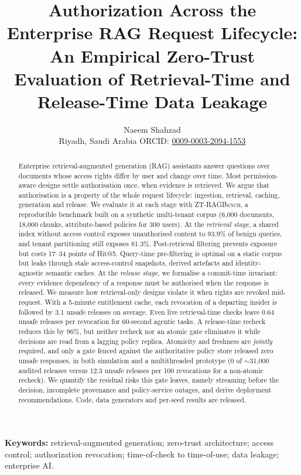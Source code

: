 \documentclass[10pt]{article}
\title{Authorization Across the Enterprise RAG Request Lifecycle:\\An Empirical Zero-Trust Evaluation of Retrieval-Time and Release-Time Data Leakage}
\author{Naeem Shahzad\\
Riyadh, Saudi Arabia \quad ORCID: \href{https://orcid.org/0009-0003-2094-1553}{0009-0003-2094-1553}\\
}
\date{}
\newcommand{\ztb}{\textsc{ZT-RAGBench}}
\begin{document}
\maketitle

\begin{abstract}
Enterprise retrieval-augmented generation (RAG) assistants answer questions over documents whose access rights differ by user and change over time. Most permission-aware designs settle authorisation once, when evidence is retrieved. We argue that authorisation is a property of the whole request lifecycle: ingestion, retrieval, caching, generation and release. We evaluate it at each stage with \ztb{}, a reproducible benchmark built on a synthetic multi-tenant corpus (6{,}000 documents, 18{,}000 chunks, attribute-based policies for 300 users). At the \emph{retrieval stage}, a shared index without access control exposes unauthorised content to 93.9\% of benign queries, and tenant partitioning still exposes 81.3\%. Post-retrieval filtering prevents exposure but costs 17--34 points of Hit@5. Query-time pre-filtering is optimal on a static corpus but leaks through stale access-control snapshots, derived artefacts and identity-agnostic semantic caches. At the \emph{release stage}, we formalise a commit-time invariant: every evidence dependency of a response must be authorised when the response is released. We measure how retrieval-only designs violate it when rights are revoked mid-request. With a 5-minute entitlement cache, each revocation of a departing insider is followed by 3.1 unsafe releases on average. Even live retrieval-time checks leave 0.64 unsafe releases per revocation for 60-second agentic tasks. A release-time recheck reduces this by 96\%, but neither recheck nor an atomic gate eliminates it while decisions are read from a lagging policy replica. Atomicity and freshness are \emph{jointly} required, and only a gate fenced against the authoritative policy store released zero unsafe responses, in both simulation and a multithreaded prototype (0 of $\sim$31{,}000 audited releases versus 12.3 unsafe releases per 100 revocations for a non-atomic recheck). We quantify the residual risks this gate leaves, namely streaming before the decision, incomplete provenance and policy-service outages, and derive deployment recommendations. Code, data generators and per-seed results are released.
\end{abstract}

\noindent\textbf{Keywords:} retrieval-augmented generation; zero-trust architecture; access control; authorization revocation; time-of-check to time-of-use; data leakage; enterprise AI.
\end{document}
